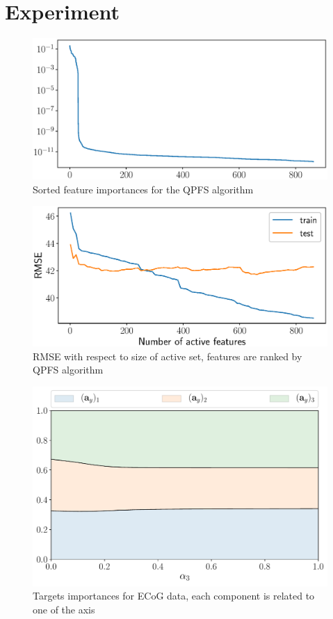 \documentclass[12pt,twoside]{article}
\begin{document}
\section{Experiment}
\begin{figure}
	\centering
	\includegraphics[width=0.7\linewidth]{figs/feature_scores_ex.eps}
	\caption{Sorted feature importances for the QPFS algorithm}
	\label{fig:feature_scores_ex}
\end{figure}

\begin{figure}
	\centering
	\includegraphics[width=0.8\linewidth]{figs/train_test_qpfs.eps}
	\caption{RMSE with respect to size of active set, features are ranked by QPFS algorithm}
	\label{fig:feature_scores_ex}
\end{figure}


\begin{figure}
	\centering
	\includegraphics[width=0.8\linewidth]{figs/features_vs_alpha_ecog_3.pdf}
	\caption{Targets importances for ECoG data, each component is related to one of the axis}
	\label{fig:features_vs_alpha_ecog_3}
\end{figure}
\end{document}

